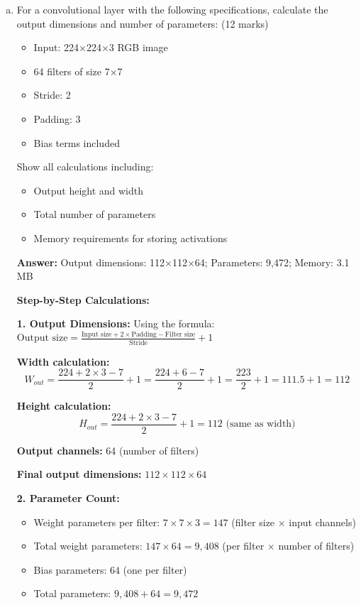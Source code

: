 \documentclass[12pt]{article}
\newcommand{\answer}[1]{{\color{answercolor}\textbf{Answer:} #1}}
\newcommand{\explanation}[1]{{\color{explanationcolor}#1}}
\begin{document}
\begin{enumerate}[(a)]
    \item For a convolutional layer with the following specifications, calculate the output dimensions and number of parameters: \hfill (12 marks)
    \begin{itemize}
        \item Input: 224×224×3 RGB image
        \item 64 filters of size 7×7
        \item Stride: 2
        \item Padding: 3
        \item Bias terms included
    \end{itemize}
    
    Show all calculations including:
    \begin{itemize}
        \item Output height and width
        \item Total number of parameters
        \item Memory requirements for storing activations
    \end{itemize}
    
    \answer{Output dimensions: 112×112×64; Parameters: 9,472; Memory: 3.1 MB}
    
    \explanation{
    \textbf{Step-by-Step Calculations:}
    
    \textbf{1. Output Dimensions:}
    Using the formula: $\text{Output size} = \frac{\text{Input size} + 2 \times \text{Padding} - \text{Filter size}}{\text{Stride}} + 1$
    
    \textbf{Width calculation:}
    $$W_{out} = \frac{224 + 2 \times 3 - 7}{2} + 1 = \frac{224 + 6 - 7}{2} + 1 = \frac{223}{2} + 1 = 111.5 + 1 = 112$$
    
    \textbf{Height calculation:}
    $$H_{out} = \frac{224 + 2 \times 3 - 7}{2} + 1 = 112 \text{ (same as width)}$$
    
    \textbf{Output channels:} 64 (number of filters)
    
    \textbf{Final output dimensions:} $112 \times 112 \times 64$
    
    \textbf{2. Parameter Count:}
    \begin{itemize}
        \item Weight parameters per filter: $7 \times 7 \times 3 = 147$ (filter size × input channels)
        \item Total weight parameters: $147 \times 64 = 9,408$ (per filter × number of filters)
        \item Bias parameters: $64$ (one per filter)
        \item Total parameters: $9,408 + 64 = 9,472$
    \end{itemize}
    
}
\end{enumerate}
\end{document}
